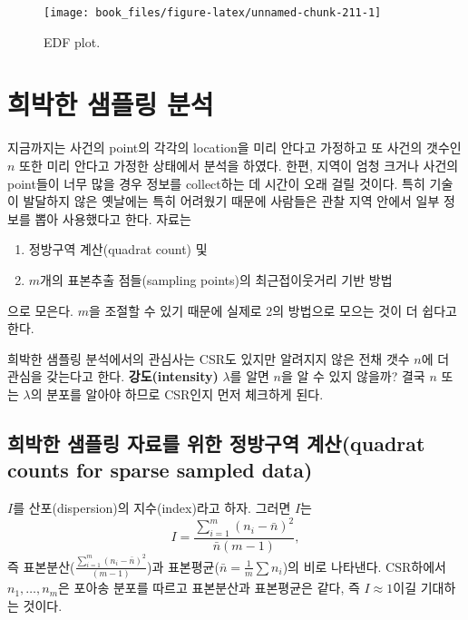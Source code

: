 \documentclass[b5paper,]{scrbook}
\theoremstyle{plain}
\theoremstyle{definition}
\numberwithin{equation}{section}
\begin{document}
\begin{figure}

{\centering \texttt{[image: book\_files/figure-latex/unnamed-chunk-211-1]} 

}

\caption{EDF plot.}\label{fig:unnamed-chunk-211}
\end{figure}

\chapter{희박한 샘플링 분석}\label{sparsesampling}

지금까지는 사건의 point의 각각의 location을 미리 안다고 가정하고 또
사건의 갯수인 \(n\) 또한 미리 안다고 가정한 상태에서 분석을 하였다.
한편, 지역이 엄청 크거나 사건의 point들이 너무 많을 경우 정보를
collect하는 데 시간이 오래 걸릴 것이다. 특히 기술이 발달하지 않은
옛날에는 특히 어려웠기 때문에 사람들은 관찰 지역 안에서 일부 정보를 뽑아
사용했다고 한다. 자료는

\begin{enumerate}
\def\labelenumi{\arabic{enumi}.}
\item
  정방구역 계산(quadrat count) 및
\item
  \(m\)개의 표본추출 점들(sampling points)의 최근접이웃거리 기반 방법
\end{enumerate}

으로 모은다. \(m\)을 조절할 수 있기 때문에 실제로 2의 방법으로 모으는
것이 더 쉽다고 한다.

희박한 샘플링 분석에서의 관심사는 CSR도 있지만 알려지지 않은 전채 갯수
\(n\)에 더 관심을 갖는다고 한다. \textbf{강도(intensity)} \(\lambda\)를
알면 \(n\)을 알 수 있지 않을까? 결국 \(n\) 또는 \(\lambda\)의 분포를
알아야 하므로 CSR인지 먼저 체크하게 된다.

\section{희박한 샘플링 자료를 위한 정방구역 계산(quadrat counts for
sparse sampled data)}\label{-----quadrat-counts-for-sparse-sampled-data}

\(I\)를 산포(dispersion)의 지수(index)라고 하자. 그러면 \(I\)는
\[I=\frac{\sum_{i=1}^{m}(n_{i}-\bar{n})^{2}}{\bar{n}(m-1)},\] 즉
표본분산(\(\frac{\sum_{i=1}^{m}(n_{i}-\bar{n})^{2}}{(m-1)}\))과
표본평균(\(\bar{n}=\frac{1}{m}\sum n_{i}\))의 비로 나타낸다. CSR하에서
\(n_{1}, \ldots, n_{m}\)은 포아송 분포를 따르고 표본분산과 표본평균은
같다, 즉 \(I \approx 1\)이길 기대하는 것이다.
\end{document}
